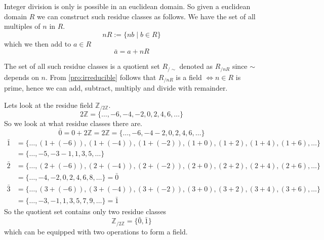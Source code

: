 Integer division is only is possible in an euclidean domain.
So given a euclidean domain \(R\) we can construct such residue classes as follows.
We have the set of all multiples of \(n\) in \(R\).
\[nR := \{nb \mid b \in R\}\]
which we then add to \(a \in R\)
\[\bar{a} = a + nR\]

The set of all such residue classes is a quotient set \(R_{/\sim}\) denoted as \(R_{/nR}\) since \(\sim\) depends on \(n\).
From \cref{pro:irreducible} follows that \(R_{/nR}\) is a field \(\iff n \in R\) is prime, hence we can add, subtract, multiply and divide with remainder.

\begin{example}
   Lets look at the residue field \(\mathbb{Z}_{/2\mathbb{Z}}\).
   \[2\mathbb{Z} = \{\ldots, -6, -4, -2, 0, 2, 4, 6, \ldots\}\]
   So we look at what residue classes there are.
   \[\bar{0} = 0 + 2\mathbb{Z} = 2\mathbb{Z} = \{\ldots, -6, -4 -2, 0, 2, 4, 6, \ldots\}\]
   \begin{equation*}
      \begin{split}
   \bar{1} & = \{\ldots, (1+(-6)), (1+(-4)), (1+(-2)), (1+0), (1+2), (1+4), (1+6), \ldots\} \\
                & = \{\ldots, -5, -3 -1, 1, 3, 5, \ldots\}
      \end{split}
   \end{equation*}
   \begin{equation*}
      \begin{split}
         \bar{2} &= \{\ldots, (2+(-6)), (2+(-4)), (2+(-2)), (2+0), (2+2), (2+4), (2+6), \ldots\} \\
                      &= \{\ldots, -4, -2, 0, 2, 4, 6, 8, \ldots\} = \bar{0}
      \end{split}
   \end{equation*}
   \begin{equation*}
      \begin{split}
         \bar{3} &= \{\ldots, (3+(-6)), (3+(-4)), (3+(-2)), (3+0), (3+2), (3+4), (3+6), \ldots\} \\
                      &= \{\ldots, -3, -1, 1, 3, 5, 7, 9, \ldots\} = \bar{1}
      \end{split}
   \end{equation*}
   So the quotient set contains only two residue classes
   \[\mathbb{Z}_{/2\mathbb{Z}} = \{\bar{0}, \bar{1}\}\]
   which can be equipped with two operations to form a field.


\end{example}
